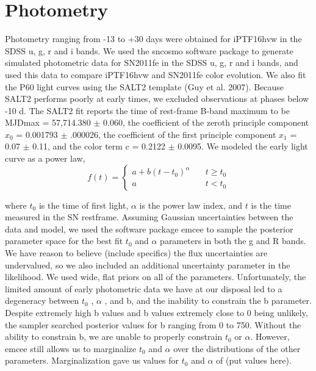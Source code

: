 \documentclass[twoside,twocolumn]{article}
\begin{document}
\section{Photometry}
Photometry ranging from -13 to +30 days were obtained for iPTF16hvw in the SDSS u, g, r and i bands. We used the sncosmo software package to generate simulated photometric data for SN2011fe in the SDSS u, g, r and i bands, and used this data to compare iPTF16hvw and SN2011fe color evolution. We also fit the P60 light curves using the SALT2 template (Guy et al. 2007). Because SALT2 performs poorly at early times, we excluded observations at phases below -10 d. The SALT2 fit reports the time of rest-frame B-band maximum to be MJDmax = 57,714.380 $\pm$ 0.060, the coefficient of the zeroth principle component $x_{0}$ = 0.001793 $\pm$ .000026, the coefficient of the first principle component $x_{1}$ = 0.07 $\pm$ 0.11, and the color term c = 0.2122 $\pm$  0.0095. 
We modeled the early light curve as a power law,
\begin{equation}
f(t) = \left\{
        \begin{array}{ll}
            a+ b(t - t_{0})^{\alpha}& \quad t  \geq t_{0} \\
            a & \quad t < t_{0}
        \end{array}
    \right.
\end{equation}

where $t_{0}$ is the time of first light, $\alpha$ is the power law index, and $t$ is the time measured in the SN restframe.  Assuming Gaussian uncertainties between the data and model, we used the software package emcee to sample the posterior parameter space for the best fit $t_{0}$  and $\alpha$ parameters in both the g and R bands. We have reason to believe (include specifics) the flux uncertainties are undervalued, so we also included an additional uncertainty parameter in the likelihood. We used wide, flat priors on all of the parameters. Unfortunately, the limited amount of early photometric data we have at our disposal led to a degeneracy between $t_{0}$ , $\alpha$ , and b, and the inability to constrain the b parameter. Despite extremely high b values and b values extremely close to 0 being unlikely, the sampler searched posterior values for b ranging from 0 to 750.  Without the ability to constrain b, we are unable to properly constrain $t_{0}$  or  $\alpha$. However, emcee still allows us to marginalize $t_{0}$ and $\alpha$ over the distributions of the other parameters. Marginalization gave us values for  $t_{0}$ and $\alpha$ of (put values here).
\end{document}
